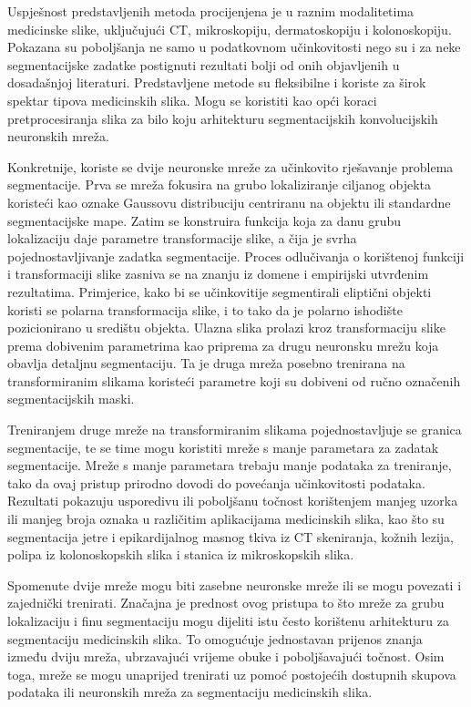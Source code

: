 Uspješnost predstavljenih metoda procijenjena je u raznim modalitetima medicinske slike, uključujući CT, mikroskopiju, dermatoskopiju i kolonoskopiju. Pokazana su poboljšanja ne samo u podatkovnom učinkovitosti nego su i za neke segmentacijske zadatke postignuti rezultati bolji od onih objavljenih u dosadašnjoj literaturi. Predstavljene metode su fleksibilne i koriste za širok spektar tipova medicinskih slika. Mogu se koristiti kao opći koraci pretprocesiranja slika za bilo koju arhitekturu segmentacijskih konvolucijskih neuronskih mreža.

Konkretnije, koriste se dvije neuronske mreže za učinkovito rješavanje problema segmentacije. Prva se mreža fokusira na grubo lokaliziranje ciljanog objekta koristeći kao oznake Gaussovu distribuciju centriranu na objektu ili standardne segmentacijske mape. Zatim se konstruira funkcija koja za danu grubu lokalizaciju daje parametre transformacije slike, a čija je svrha pojednostavljivanje zadatka segmentacije. Proces odlučivanja o korištenoj funkciji i transformaciji slike zasniva se na znanju iz domene i empirijski utvrđenim rezultatima. Primjerice, kako bi se učinkovitije segmentirali eliptični objekti koristi se polarna transformacija slike, i to tako da je polarno ishodište pozicionirano u središtu objekta. Ulazna slika prolazi kroz transformaciju slike prema dobivenim parametrima kao priprema za drugu neuronsku mrežu koja obavlja detaljnu segmentaciju. Ta je druga mreža posebno trenirana na transformiranim slikama koristeći parametre koji su dobiveni od ručno označenih segmentacijskih maski.

Treniranjem druge mreže na transformiranim slikama pojednostavljuje se granica segmentacije, te se time mogu koristiti mreže s manje parametara za zadatak segmentacije. Mreže s manje parametara trebaju manje podataka za treniranje, tako da ovaj pristup prirodno dovodi do povećanja učinkovitosti podataka. Rezultati pokazuju usporedivu ili poboljšanu točnost korištenjem manjeg uzorka ili manjeg broja oznaka u različitim aplikacijama medicinskih slika, kao što su segmentacija jetre i epikardijalnog masnog tkiva iz CT skeniranja, kožnih lezija, polipa iz kolonoskopskih slika i stanica iz mikroskopskih slika.

Spomenute dvije mreže mogu biti zasebne neuronske mreže ili se mogu povezati i zajednički trenirati. Značajna je prednost ovog pristupa to što mreže za grubu lokalizaciju i finu segmentaciju mogu dijeliti istu često korištenu arhitekturu za segmentaciju medicinskih slika. To omogućuje jednostavan prijenos znanja između dviju mreža, ubrzavajući vrijeme obuke i poboljšavajući točnost. Osim toga, mreže se mogu unaprijed trenirati uz pomoć postojećih dostupnih skupova podataka ili neuronskih mreža za segmentaciju medicinskih slika.

